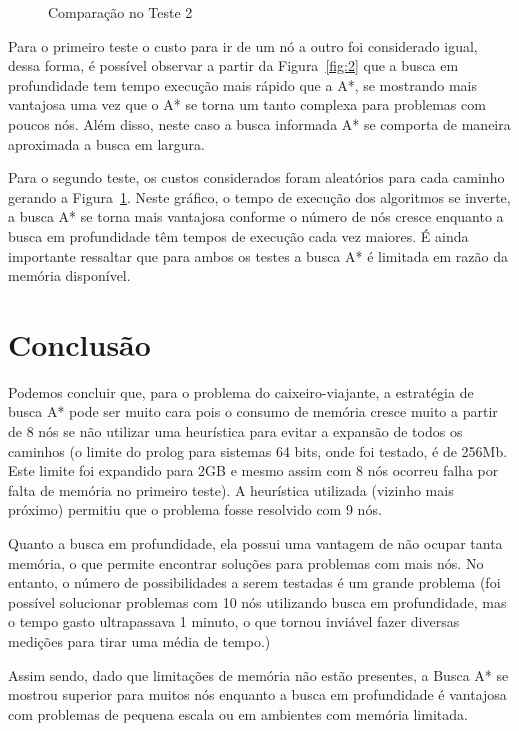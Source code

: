 \documentclass[12pt,a4paper]{article}
\begin{document}
\begin{figure}[ht]
  \centering
  
  \caption{Comparação no Teste 2}
  \label{fig:3}
\end{figure}

Para o primeiro teste o custo para ir de um nó a outro foi considerado igual, dessa forma, é possível observar a partir da Figura~\ref{fig:2} que a busca em profundidade tem tempo execução mais rápido que a A*, se mostrando mais vantajosa uma vez que o A* se torna um tanto complexa para problemas com poucos nós. Além disso, neste caso a busca informada A* se comporta de maneira aproximada a busca em largura.

Para o segundo teste, os custos considerados foram aleatórios para cada caminho gerando a Figura~\ref{fig:3}. Neste gráfico, o  tempo de execução dos algoritmos se inverte, a busca A* se torna mais vantajosa conforme o número de nós cresce enquanto a busca em profundidade têm tempos de execução cada vez maiores.
É ainda importante ressaltar que para ambos os testes a busca A* é limitada em razão da memória disponível.

\newpage
\section{Conclusão}
	Podemos concluir que, para o problema do caixeiro-viajante, a estratégia de busca A* pode ser muito cara pois o consumo de memória cresce muito a partir de 8 nós se não utilizar uma heurística para evitar a expansão de todos os caminhos (o limite do prolog para sistemas 64 bits, onde foi testado, é de 256Mb. Este limite foi expandido para 2GB e mesmo assim com 8 nós ocorreu falha por falta de memória no primeiro teste). A heurística utilizada (vizinho mais próximo) permitiu que o problema fosse resolvido com 9 nós.

	Quanto a busca em profundidade, ela possui uma vantagem de não ocupar tanta memória, o que permite encontrar soluções para problemas com mais nós. No entanto, o número de possibilidades a serem testadas é um grande problema (foi possível solucionar problemas com 10 nós utilizando busca em profundidade, mas o tempo gasto ultrapassava 1 minuto, o que tornou inviável fazer diversas medições para tirar uma média de tempo.)

  Assim sendo, dado que limitações de memória não estão presentes, a Busca A* se mostrou superior para muitos nós enquanto a busca em profundidade é vantajosa com problemas de pequena escala ou em ambientes com memória limitada.
\appendix
\end{document}
